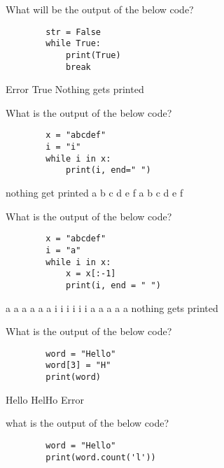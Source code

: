 \documentclass{exam}
\begin{document}
\begin{questions}
    \question What will be the output of the below code?

    \begin{verbatim}
        str = False
        while True:
            print(True)
            break
    \end{verbatim}

    \begin{oneparchoices}
        \choice Error
        \choice True
        \choice Nothing gets printed
    \end{oneparchoices}
    
    \question What is the output of the below code?

    \begin{verbatim}
        x = "abcdef"
        i = "i"
        while i in x:
            print(i, end=" ")
    \end{verbatim}
    
    \begin{oneparchoices}
        \choice nothing get printed
        \choice a b c d e f
        \choice a b c
        \choice d e f
    \end{oneparchoices}

    \question What is the output of the below code?

    \begin{verbatim}
        x = "abcdef"
        i = "a"
        while i in x:
            x = x[:-1]
            print(i, end = " ")
    \end{verbatim}

    \begin{oneparchoices}
        \choice a a a a a a
        \choice i i i i i i
        \choice a a a a a
        \choice nothing gets printed
    \end{oneparchoices}

    \question What is the output of the below code?

    \begin{verbatim}
        word = "Hello"
        word[3] = "H"
        print(word)
    \end{verbatim}

    \begin{oneparchoices}
        \choice Hello
        \choice HelHo
        \choice Error
    \end{oneparchoices}

    \question what is the output of the below code?

    \begin{verbatim}
        word = "Hello"
        print(word.count('l'))
    \end{verbatim}


\end{questions}
\end{document}
